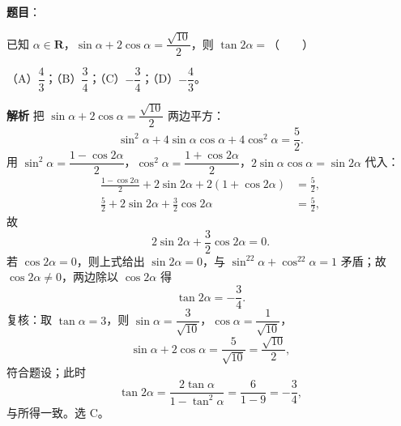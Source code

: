 \begin{answer}

\textbf{题目}：

已知 $\alpha\in\mathbf R$，$\sin\alpha+2\cos\alpha=\dfrac{\sqrt{10}}2$，则 $\tan2\alpha=$\mbox{（　　）}

（A）$\dfrac43$；（B）$\dfrac34$；（C）$-\dfrac34$；（D）$-\dfrac43$。

\textbf{解析}
把 $\sin\alpha+2\cos\alpha=\dfrac{\sqrt{10}}2$ 两边平方：
\nopagebreak[4]
\[\sin^2\alpha+4\sin\alpha\cos\alpha+4\cos^2\alpha=\frac52.\]
用 $\sin^2\alpha=\dfrac{1-\cos2\alpha}2$，$\cos^2\alpha=\dfrac{1+\cos2\alpha}2$，$2\sin\alpha\cos\alpha=\sin2\alpha$ 代入：
\nopagebreak[4]
\[\begin{aligned}
\frac{1-\cos2\alpha}2+2\sin2\alpha+2(1+\cos2\alpha)&=\frac52,\\
\frac52+2\sin2\alpha+\frac32\cos2\alpha&=\frac52,
\end{aligned}\]
故
\nopagebreak[4]
\[2\sin2\alpha+\frac32\cos2\alpha=0.\]
若 $\cos2\alpha=0$，则上式给出 $\sin2\alpha=0$，与 $\sin^22\alpha+\cos^22\alpha=1$ 矛盾；故 $\cos2\alpha\neq0$，两边除以 $\cos2\alpha$ 得
\nopagebreak[4]
\[\tan2\alpha=-\frac34.\]
复核：取 $\tan\alpha=3$，则 $\sin\alpha=\dfrac3{\sqrt{10}}$，$\cos\alpha=\dfrac1{\sqrt{10}}$，
\nopagebreak[4]
\[\sin\alpha+2\cos\alpha=\frac5{\sqrt{10}}=\frac{\sqrt{10}}2,\]
符合题设；此时
\nopagebreak[4]
\[\tan2\alpha=\frac{2\tan\alpha}{1-\tan^2\alpha}=\frac6{1-9}=-\frac34,\]
与所得一致。选 C。


\end{answer}
